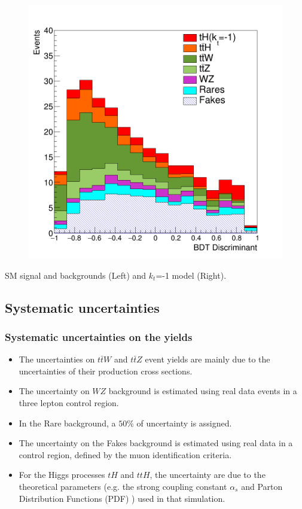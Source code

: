 \documentclass[11pt]{beamer}
\begin{document}
{\begin{frame}
\begin{minipage}[b]{.48\textwidth}
\begin{figure}
		\includegraphics[width=\textwidth]{figures/kos2.png}
	\end{figure}
\end{minipage}
\begin{center}
\small{SM signal and backgrounds (Left) and $k_t$=-1 model (Right).}
\end{center}
\end{frame}
}


\begin{frame}
\subsection{Systematic uncertainties}
\frametitle{Systematic uncertainties on the yields}
\begin{itemize}
\item The uncertainties on $t\bar{t}W$ and $t\bar{t}Z$ event yields are mainly due to the uncertainties of their production cross sections. 
\item The uncertainty on $WZ$ background is estimated using real data events in a three lepton control region. 
\item In the Rare background, a $50\%$ of uncertainty is assigned.
\item The uncertainty on the Fakes background is estimated using real data in a control region, defined by the muon identification criteria. 
\item For the Higgs processes $tH$ and $ttH$, the uncertainty are due to the theoretical parameters (e.g. the strong coupling constant $\alpha_s$ and Parton Distribution Functions (PDF) ) used in that simulation.
\end{itemize}
\end{frame}
\end{document}
